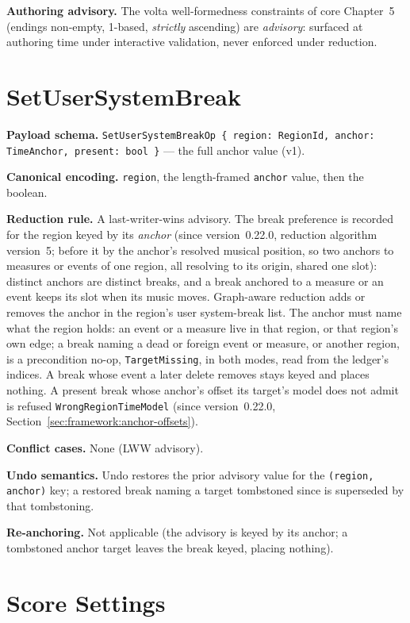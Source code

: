 \documentclass[11pt,letterpaper]{report}
\begin{document}
\textbf{Authoring advisory.} The volta well-formedness constraints of
core Chapter~5 (endings non-empty, 1-based, \emph{strictly} ascending) are
\emph{advisory}: surfaced at authoring time under interactive validation,
never enforced under reduction.

\section{SetUserSystemBreak}
\label{sec:k0:set-user-system-break}

\textbf{Payload schema.} \texttt{SetUserSystemBreakOp \{ region: RegionId,
anchor: TimeAnchor, present: bool \}} --- the full anchor value (v1).

\textbf{Canonical encoding.} \texttt{region}, the length-framed \texttt{anchor}
value, then the boolean.

\textbf{Reduction rule.} A last-writer-wins advisory. The break preference is
recorded for the region keyed by its \emph{anchor} (since version~0.22.0,
reduction algorithm version~5; before it by the anchor's resolved musical
position, so two anchors to measures or events of one region, all resolving
to its origin, shared one slot): distinct anchors are distinct breaks, and a
break anchored to a measure or an event keeps its slot when its music moves.
Graph-aware reduction adds or removes the anchor in the region's user
system-break list. The anchor must name what the region holds: an event or a
measure live in that region, or that region's own edge; a break naming a dead
or foreign event or measure, or another region, is a precondition no-op,
\texttt{TargetMissing}, in both modes, read from the ledger's indices. A
break whose event a later delete removes stays keyed and places nothing. A
present break whose anchor's offset its target's model does not admit is
refused \texttt{WrongRegionTimeModel} (since version~0.22.0,
Section~\ref{sec:framework:anchor-offsets}).

\textbf{Conflict cases.} None (LWW advisory).

\textbf{Undo semantics.} Undo restores the prior advisory value for the
\texttt{(region, anchor)} key; a restored break naming a target tombstoned
since is superseded by that tombstoning.

\textbf{Re-anchoring.} Not applicable (the advisory is keyed by its anchor; a
tombstoned anchor target leaves the break keyed, placing nothing).

\section{Score Settings}
\label{sec:k0:score-settings}
\end{document}
